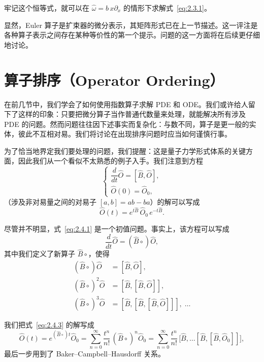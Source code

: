 牢记这个恒等式，就可以在 $\hat{\omega}=b\,x\partial_{x}$ 的情形下求解式~\eqref{eq:2.3.1}。

显然，Euler 算子是扩束器的微分表示，其矩阵形式已在上一节描述。这一评注是各种算子表示之间存在某种等价性的第一个提示。问题的这一方面将在后续更仔细地讨论。

\section{算子排序（Operator Ordering）}

在前几节中，我们学会了如何使用指数算子求解 PDE 和 ODE。我们或许给人留下了这样的印象：只要把微分算子当作普通代数量来处理，就能解决所有涉及 PDE 的问题。然而问题往往因下述事实而复杂化：与数不同，算子是更一般的实体，彼此不互相对易。我们将讨论在出现排序问题时应当如何谨慎行事。

为了恰当地界定我们要处理的问题，我们提醒：这是量子力学形式体系的关键方面，因此我们从一个看似不太熟悉的例子入手。我们注意到方程
\begin{equation}
\begin{cases}
\dfrac{d}{dt}\hat{O}=[\hat{B},\hat{O}],\\[2mm]
\hat{O}(0)=\hat{O}_{0},
\end{cases}
\label{eq:2.4.1}
\end{equation}
（涉及非对易量之间的对易子 $[a,b]=ab-ba$）的解可以写成
\begin{equation}
\hat{O}(t)=e^{t\hat{B}}\,\hat{O}_{0}\,e^{-t\hat{B}}.
\label{eq:2.4.2}
\end{equation}

尽管并不明显，式~\eqref{eq:2.4.1} 是一个初值问题。事实上，该方程可以写成
\begin{equation}
\frac{d}{dt}\hat{O}=(\hat{B}\circ)\hat{O},
\label{eq:2.4.3}
\end{equation}
其中我们定义了新算子 $\hat{B}\circ$，使得
\begin{align}
(\hat{B}\circ)\hat{O}&=[\hat{B},\hat{O}],\\
(\hat{B}\circ)^{2}\hat{O}&=[\hat{B},[\hat{B},\hat{O}]],\\
(\hat{B}\circ)^{3}\hat{O}&=[\hat{B},[\hat{B},[\hat{B},\hat{O}]]],\;\ldots
\label{eq:2.4.4}
\end{align}

我们把式~\eqref{eq:2.4.3} 的解写成
\begin{equation}
\hat{O}(t)=e^{(\hat{B}\circ)t}\hat{O}_{0}
=\sum_{n=0}^{\infty}\frac{t^{n}}{n!}\,(\hat{B}\circ)^{n}\hat{O}_{0}
=\sum_{n=0}^{\infty}\frac{t^{n}}{n!}\,
\bigl[\hat{B},\ldots[\hat{B},[\hat{B},\hat{O}_{0}]]\bigr],
\label{eq:2.4.5}
\end{equation}
最后一步用到了 Baker--Campbell--Hausdorff 关系。


